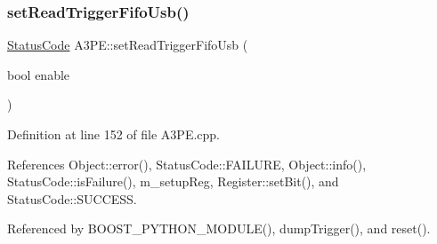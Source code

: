 \subsubsection{\texorpdfstring{set\+Read\+Trigger\+Fifo\+Usb()}{setReadTriggerFifoUsb()}}
{\footnotesize\ttfamily \hyperlink{classStatusCode}{Status\+Code} A3\+P\+E\+::set\+Read\+Trigger\+Fifo\+Usb (\begin{DoxyParamCaption}\item[{bool}]{enable }\end{DoxyParamCaption})}



Definition at line 152 of file A3\+P\+E.\+cpp.



References Object\+::error(), Status\+Code\+::\+F\+A\+I\+L\+U\+RE, Object\+::info(), Status\+Code\+::is\+Failure(), m\+\_\+setup\+Reg, Register\+::set\+Bit(), and Status\+Code\+::\+S\+U\+C\+C\+E\+SS.



Referenced by B\+O\+O\+S\+T\+\_\+\+P\+Y\+T\+H\+O\+N\+\_\+\+M\+O\+D\+U\+L\+E(), dump\+Trigger(), and reset().


